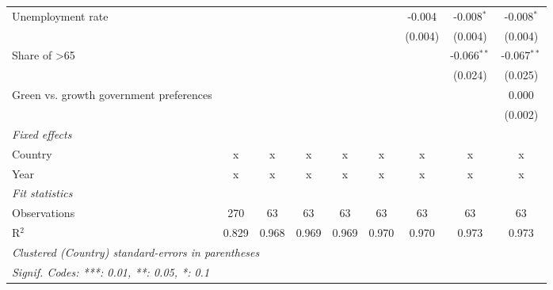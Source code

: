 \begin{table}[htbp]
\begin{tabular}{lcccccccc}
      Unemployment rate                                       &         &         &         &         &         & -0.004  & -0.008$^{*}$  & -0.008$^{*}$\\   
                                                              &         &         &         &         &         & (0.004) & (0.004)       & (0.004)\\   
      Share of >65                                            &         &         &         &         &         &         & -0.066$^{**}$ & -0.067$^{**}$\\   
                                                              &         &         &         &         &         &         & (0.024)       & (0.025)\\   
      Green vs. growth government preferences                 &         &         &         &         &         &         &               & 0.000\\   
                                                              &         &         &         &         &         &         &               & (0.002)\\   
      \emph{Fixed effects}\\
      Country                                                 & x       & x       & x       & x       & x       & x       & x             & x\\  
      Year                                                    & x       & x       & x       & x       & x       & x       & x             & x\\  
      \midrule \emph{Fit statistics}\\
      Observations                                            & 270     & 63      & 63      & 63      & 63      & 63      & 63            & 63\\  
      R$^2$                                                   & 0.829   & 0.968   & 0.969   & 0.969   & 0.970   & 0.970   & 0.973         & 0.973\\  
      \midrule
      \multicolumn{9}{l}{\emph{Clustered (Country) standard-errors in parentheses}}\\
      \multicolumn{9}{l}{\emph{Signif. Codes: ***: 0.01, **: 0.05, *: 0.1}}\\
   \end{tabular}
\end{table}



